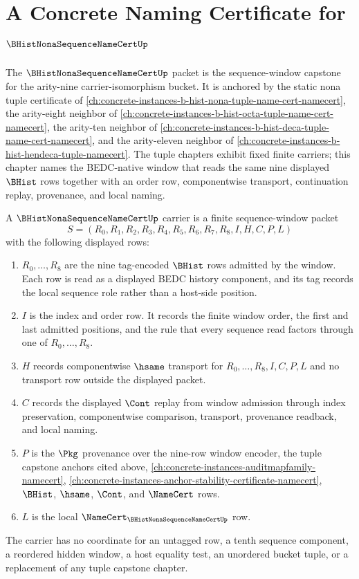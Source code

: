 \chapter{A Concrete Naming Certificate for $\BHistNonaSequenceNameCertUp$}
\label{ch:concrete-instances-b-hist-nona-sequence-name-cert-namecert}

The $\BHistNonaSequenceNameCertUp$ packet is the sequence-window capstone for the arity-nine carrier-isomorphism bucket. It is anchored by the static nona tuple certificate of \autoref{ch:concrete-instances-b-hist-nona-tuple-name-cert-namecert}, the arity-eight neighbor of \autoref{ch:concrete-instances-b-hist-octa-tuple-name-cert-namecert}, the arity-ten neighbor of \autoref{ch:concrete-instances-b-hist-deca-tuple-name-cert-namecert}, and the arity-eleven neighbor of \autoref{ch:concrete-instances-b-hist-hendeca-tuple-namecert}. The tuple chapters exhibit fixed finite carriers; this chapter names the BEDC-native window that reads the same nine displayed $\BHist$ rows together with an order row, componentwise transport, continuation replay, provenance, and local naming.

\begin{definition}
\label{def:b-hist-nona-sequence-name-cert-carrier}
A $\BHistNonaSequenceNameCertUp$ carrier is a finite sequence-window packet
$$
S=(R_0,R_1,R_2,R_3,R_4,R_5,R_6,R_7,R_8,I,H,C,P,L)
$$
with the following displayed rows:
\begin{enumerate}
\item $R_0,\ldots,R_8$ are the nine tag-encoded $\BHist$ rows admitted by the window. Each row is read as a displayed BEDC history component, and its tag records the local sequence role rather than a host-side position.
\item $I$ is the index and order row. It records the finite window order, the first and last admitted positions, and the rule that every sequence read factors through one of $R_0,\ldots,R_8$.
\item $H$ records componentwise $\hsame$ transport for $R_0,\ldots,R_8,I,C,P,L$ and no transport row outside the displayed packet.
\item $C$ records the displayed $\Cont$ replay from window admission through index preservation, componentwise comparison, transport, provenance readback, and local naming.
\item $P$ is the $\Pkg$ provenance over the nine-row window encoder, the tuple capstone anchors cited above, \autoref{ch:concrete-instances-auditmapfamily-namecert}, \autoref{ch:concrete-instances-anchor-stability-certificate-namecert}, $\BHist$, $\hsame$, $\Cont$, and $\NameCert$ rows.
\item $L$ is the local $\NameCert_{\BHistNonaSequenceNameCertUp}$ row.
\end{enumerate}
The carrier has no coordinate for an untagged row, a tenth sequence component, a reordered hidden window, a host equality test, an unordered bucket tuple, or a replacement of any tuple capstone chapter.
\end{definition}

